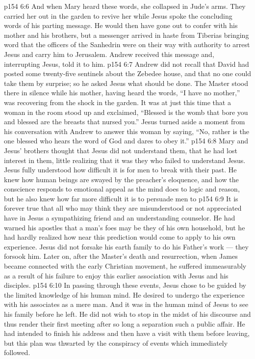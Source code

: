 \vs p154 6:6 And when Mary heard these words, she collapsed in Jude’s arms. They carried her out in the garden to revive her while Jesus spoke the concluding words of his parting message. He would then have gone out to confer with his mother and his brothers, but a messenger arrived in haste from Tiberias bringing word that the officers of the Sanhedrin were on their way with authority to arrest Jesus and carry him to Jerusalem. Andrew received this message and, interrupting Jesus, told it to him.
\vs p154 6:7 Andrew did not recall that David had posted some twenty\hyp{}five sentinels about the Zebedee house, and that no one could take them by surprise; so he asked Jesus what should be done. The Master stood there in silence while his mother, having heard the words, \textcolor{ubdarkred}{“I have no mother,”} was recovering from the shock in the garden. It was at just this time that a woman in the room stood up and exclaimed, “Blessed is the womb that bore you and blessed are the breasts that nursed you.” Jesus turned aside a moment from his conversation with Andrew to answer this woman by saying, \textcolor{ubdarkred}{“No, rather is the one blessed who hears the word of God and dares to obey it.”}
\vs p154 6:8 \pc Mary and Jesus’ brothers thought that Jesus did not understand them, that he had lost interest in them, little realizing that it was they who failed to understand Jesus. Jesus fully understood how difficult it is for men to break with their past. He knew how human beings are swayed by the preacher’s eloquence, and how the conscience responds to emotional appeal as the mind does to logic and reason, but he also knew how far more difficult it is to persuade men to 
\vs p154 6:9 It is forever true that all who may think they are misunderstood or not appreciated have in Jesus a sympathizing friend and an understanding counselor. He had warned his apostles that a man’s foes may be they of his own household, but he had hardly realized how near this prediction would come to apply to his own experience. Jesus did not forsake his earth family to do his Father’s work --- they forsook him. Later on, after the Master’s death and resurrection, when James became connected with the early Christian movement, he suffered immeasurably as a result of his failure to enjoy this earlier association with Jesus and his disciples.
\vs p154 6:10 \pc In passing through these events, Jesus chose to be guided by the limited knowledge of his human mind. He desired to undergo the experience with his associates as a mere man. And it was in the human mind of Jesus to see his family before he left. He did not wish to stop in the midst of his discourse and thus render their first meeting after so long a separation such a public affair. He had intended to finish his address and then have a visit with them before leaving, but this plan was thwarted by the conspiracy of events which immediately followed.
